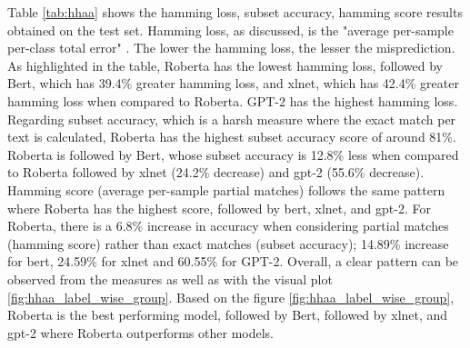Table \ref{tab:hhaa} shows the hamming loss, subset accuracy, hamming score results obtained on the test set. Hamming loss, as discussed, is the "average per-sample per-class total error" \cite{sokolova2009systematic}. The lower the hamming loss, the lesser the misprediction. As highlighted in the table, Roberta has the lowest hamming loss, followed by Bert, which has 39.4\% greater hamming loss, and xlnet, which has 42.4\% greater hamming loss when compared to Roberta. GPT-2 has the highest hamming loss. Regarding subset accuracy, which is a harsh measure where the exact match per text is calculated, Roberta has the highest subset accuracy score of around 81\%. Roberta is followed by Bert, whose subset accuracy is 12.8\% less when compared to Roberta followed by xlnet (24.2\% decrease) and gpt-2 (55.6\% decrease). Hamming score (average per-sample partial matches) follows the same pattern where Roberta has the highest score, followed by bert, xlnet, and gpt-2. For Roberta, there is a 6.8\% increase in accuracy when considering partial matches (hamming score) rather than exact matches (subset accuracy); 14.89\% increase for bert, 24.59\% for xlnet and 60.55\% for GPT-2.
Overall, a clear pattern can be observed from the measures as well as with the visual plot \ref{fig:hhaa_label_wise_group}. Based on the figure  \ref{fig:hhaa_label_wise_group}, Roberta is the best performing model, followed by Bert, followed by xlnet, and gpt-2 where Roberta outperforms other models.
\pagebreak


